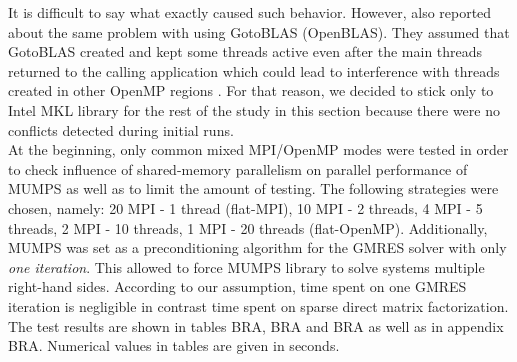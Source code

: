 It is difficult to say what exactly caused such behavior. However, \citeauthor{chowdhury2010some} also reported about the same problem with using GotoBLAS (OpenBLAS). They assumed that GotoBLAS created and kept some threads active even after the main threads returned to the calling application which could lead to interference with threads created in other OpenMP regions \cite{chowdhury2010some}. For that reason, we decided to stick only to Intel MKL library for the rest of the study in this section because there were no conflicts detected during initial runs.\\


At the beginning, only common mixed MPI/OpenMP modes were tested in order to check influence of shared-memory parallelism on parallel performance of MUMPS as well as to limit the amount of testing. The following strategies were chosen, namely: 20 MPI - 1 thread (flat-MPI), 10 MPI - 2 threads, 4 MPI - 5 threads, 2 MPI - 10 threads, 1 MPI - 20 threads (flat-OpenMP). Additionally, MUMPS was set as a preconditioning algorithm for the GMRES solver with only \textit{one iteration}. This allowed to force MUMPS library to solve systems multiple right-hand sides. According to our assumption, time spent on one GMRES iteration is negligible in contrast time spent on sparse direct matrix factorization. The test results are shown in tables BRA, BRA and BRA as well as in appendix BRA. Numerical values in tables are given in seconds.\\



